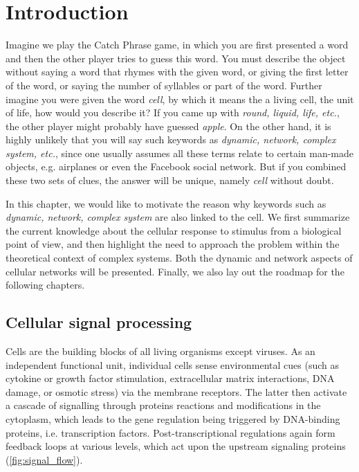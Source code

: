 \chapter{Introduction}
Imagine we play the Catch Phrase game, in which you are
first presented a word and then the other player tries 
to guess this
word. You must describe the object without saying a word that rhymes with the given word, or giving the first letter of the word, or saying the number of syllables or part of the word.
Further imagine you were given the word \emph{cell}, 
by which it means the a living cell, the unit of life,
how 
would you describe it? If you came up with \emph{round,
liquid, life, etc.}, the other player might probably have guessed 
\emph{apple}. On the other hand, it is highly unlikely that 
you will say such keywords as
\emph{dynamic, network, complex system, etc.}, since one 
usually assumes all these terms relate to certain man-made 
objects, e.g. airplanes or even the Facebook social network. 
But if you combined these two sets of clues, 
the answer will be unique, namely \emph{cell} without doubt.

In this chapter, we would like to motivate the reason 
why keywords such
as \emph{dynamic, network, complex system} are also linked
to the cell.
We first summarize the current knowledge about
the cellular response to stimulus from a biological point of
view, and then highlight the need to approach the problem
within the theoretical context of complex systems. 
Both the dynamic and 
network aspects of cellular networks will be presented. 
Finally, we also lay out the roadmap for the following 
chapters.

\section{Cellular signal processing}
Cells are the building blocks of all living organisms except viruses. As an 
independent functional unit, individual cells sense environmental cues 
(such as cytokine or growth factor stimulation, extracellular matrix interactions, DNA damage, or osmotic stress) via the membrane receptors. The latter
then activate a cascade of signalling through proteins reactions and modifications in the cytoplasm,
which leads to the gene regulation being triggered by 
DNA-binding proteins, i.e. transcription factors. Post-transcriptional
regulations again form feedback loops at various levels, which act upon the
upstream signaling proteins (\ref{fig:signal_flow}).

